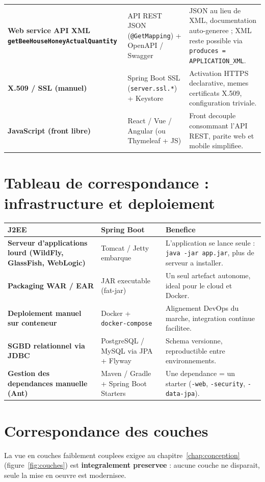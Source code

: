 \begin{longtable}{>{\bfseries}p{3cm} p{3.4cm} p{7.2cm}}
Web service API XML \texttt{getBeeHouseHoneyActualQuantity} & API REST JSON (\texttt{@GetMapping}) + OpenAPI / Swagger & JSON au lieu de XML, documentation auto-generee ; XML reste possible via \texttt{produces = APPLICATION\_XML}. \\
X.509 / SSL (manuel) & Spring Boot SSL (\texttt{server.ssl.*}) + Keystore & Activation HTTPS declarative, memes certificats X.509, configuration triviale. \\
JavaScript (front libre) & React / Vue / Angular (ou Thymeleaf + JS) & Front decouple consommant l'API REST, parite web et mobile simplifiee. \\
\bottomrule
\end{longtable}

\section{Tableau de correspondance : infrastructure et deploiement}
\begin{longtable}{>{\bfseries}p{4cm} p{4.5cm} p{5.3cm}}
\toprule
\textbf{J2EE} & \textbf{Spring Boot} & \textbf{Benefice} \\
\midrule
\endhead
Serveur d'applications lourd (WildFly, GlassFish, WebLogic) & Tomcat / Jetty embarque & L'application se lance seule : \texttt{java -jar app.jar}, plus de serveur a installer. \\
Packaging WAR / EAR & JAR executable (fat-jar) & Un seul artefact autonome, ideal pour le cloud et Docker. \\
Deploiement manuel sur conteneur & Docker + \texttt{docker-compose} & Alignement DevOps du marche, integration continue facilitee. \\
SGBD relationnel via JDBC & PostgreSQL / MySQL via JPA + Flyway & Schema versionne, reproductible entre environnements. \\
Gestion des dependances manuelle (Ant) & Maven / Gradle + Spring Boot Starters & Une dependance = un starter (\texttt{-web}, \texttt{-security}, \texttt{-data-jpa}). \\
\bottomrule
\end{longtable}

\section{Correspondance des couches}
La vue en couches faiblement couplees exigee au chapitre~\ref{chap:conception}
(figure~\ref{fig:couches}) est \textbf{integralement preservee} : aucune couche
ne disparait, seule la mise en oeuvre est modernisee.

